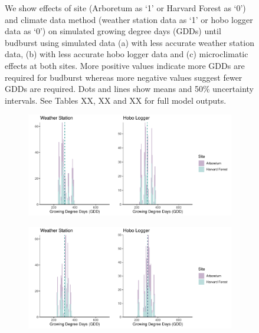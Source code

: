 \documentclass{article}\usepackage[]{graphicx}\usepackage[]{color}
\begin{document}
\begin{figure}
\begin{subfigure}{.32\textwidth}
      \label{fig:muplotmicros}
  \end{subfigure}
\caption{ We show effects of site (Arboretum as `1' or Harvard Forest as `0') and climate data method (weather station data as `1' or hobo logger data as `0') on simulated growing degree days (GDDs) until budburst using simulated data (a) with less accurate weather station data, (b) with less accurate hobo logger data and (c) microclimatic effects at both sites. More positive values indicate more GDDs are required for budburst whereas more negative values suggest fewer GDDs are required. Dots and lines show means and 50\% uncertainty intervals. See Tables XX, XX and XX for full model outputs.}
\label{fig:simsmus}
\end{figure}


\begin{figure}
  \begin{subfigure}{.32\textwidth}
    \caption{}
    \centering
    \includegraphics[width=\linewidth]{..//analyses/figures/gdd_methods_noisyws.pdf}
    \label{fig:gddnoisyws}
  \end{subfigure}%
    \begin{subfigure}{.32\textwidth}
      \caption{}
      \centering
      \includegraphics[width=\linewidth]{..//analyses/figures/gdd_methods_noisyhobo.pdf}

\end{subfigure}
\end{figure}
\end{document}
